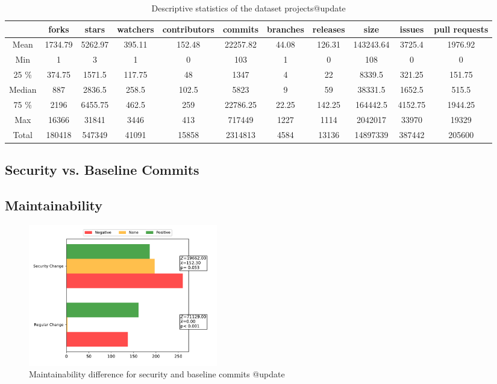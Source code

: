 \documentclass[10pt,conference]{IEEEtran}
\begin{document}
\begin{table}[h]
\centering
\caption{Descriptive statistics of the dataset projects\textcolor{mypink3}{@update}} \label{tab:dataset}
\begin{tabular}{@{}ccccccccccc@{}}
\toprule
     & forks   & stars   & watchers & contributors & commits  & branches & releases & size      & issues  & pull requests \\ \midrule
Mean & 1734.79 & 5262.97 & 395.11   & 152.48       & 22257.82 & 44.08    & 126.31   & 143243.64 & 3725.4  & 1976.92       \\
Min     & 1       & 3       & 1        & 0            & 103      & 1        & 0        & 108       & 0       & 0             \\
25 \%     & 374.75  & 1571.5  & 117.75   & 48           & 1347     & 4        & 22       & 8339.5    & 321.25  & 151.75        \\
Median     & 887     & 2836.5  & 258.5    & 102.5        & 5823     & 9        & 59       & 38331.5   & 1652.5  & 515.5         \\
75 \%     & 2196    & 6455.75 & 462.5    & 259          & 22786.25 & 22.25    & 142.25   & 164442.5  & 4152.75 & 1944.25       \\
Max     & 16366   & 31841   & 3446     & 413          & 717449   & 1227     & 1114     & 2042017   & 33970   & 19329         \\
Total     & 180418  & 547349  & 41091    & 15858        & 2314813  & 4584     & 13136    & 14897339  & 387442  & 205600        \\ \bottomrule
\end{tabular}
\end{table}



\subsection{Security vs. Baseline Commits}



\subsection{Maintainability}


\begin{figure}[h]
 	\centering
 	\includegraphics[width=0.4\textwidth]{figures/maintainability.pdf}
 	\caption{Maintainability difference for security and baseline commits \textcolor{mypink3}{@update}}
\end{figure}
\end{document}
